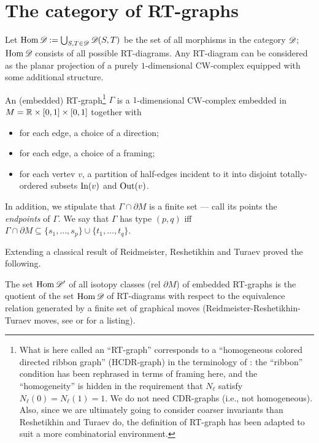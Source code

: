 \section{The category of RT-graphs}
\label{sec:rt-graphs}
Let $\operatorname{Hom}\mathscr{D}_{} := \bigcup_{S,T \in \mathscr{D}_{}} \mathscr{D}_{}(S,T)$ be the set of all
morphisms in the category $\mathscr{D}_{}$; $\operatorname{Hom}\mathscr{D}_{}$ consists of all possible
RT-diagrams. Any RT-diagram can be considered as the planar projection
of a purely $1$-dimensional CW-complex equipped with some additional
structure.
\begin{definition}
  An (embedded) RT-graph\footnote{What is here called an ``RT-graph''
    corresponds to a ``homogeneous colored directed ribbon graph''
    (HCDR-graph) in the terminology of
    \cite{reshetikhin-turaev;ribbon-graphs}: the ``ribbon'' condition
    has been rephrased in terms of framing here, and the
    ``homogeneity'' is hidden in the requirement that $N_\ell$ satisfy
    $N_\ell(0) = N_\ell(1) = 1$. We do not need CDR-graphs (i.e., not
    homogeneous). Also, since we are ultimately going to consider
    coarser invariants than Reshetikhin and Turaev do, the definition
    of RT-graph has been adapted to suit a more combinatorial
    environment.} $\Gamma$ is a $1$-dimensional CW-complex embedded in $M
  = \mathbb{R} \times [0,1] \times [0,1]$ together with
  \begin{itemize}
  \item for each edge, a choice of a direction;
  \item for each edge, a choice of a framing;
  \item for each vertev $v$, a partition of half-edges incident to it
    into disjoint totally-ordered subsets $\operatorname{In}(v)$ and $\operatorname{Out}(v)$.
  \end{itemize}
  In addition, we stipulate that $\Gamma \cap \partial M$ is a finite set --- call
  its points the \emph{endpoints} of $\Gamma$.  We say that $\Gamma$ has type
  $(p,q)$ iff $\Gamma \cap \partial M \subseteq \{ s_1, \ldots, s_p \} \cup \{ t_1, \ldots, t_q \}$.
\end{definition}
Extending a classical result of Reidmeister, Reshetikhin and Turaev
proved the following.
\begin{lemma}\label{lemma:moves}
  The set $\operatorname{Hom}\mathscr{D}'_{}$ of all isotopy classes (rel $\partial M$) of embedded
  RT-graphs is the quotient of the set $\operatorname{Hom}\mathscr{D}_{}$ of RT-diagrams
  with respect to the equivalence relation generated by a finite set
  of graphical moves (Reidmeister-Reshetikhin-Turaev moves, see
   or \cite{reshetikhin-turaev;ribbon-graphs} for a
  listing).
\end{lemma}
